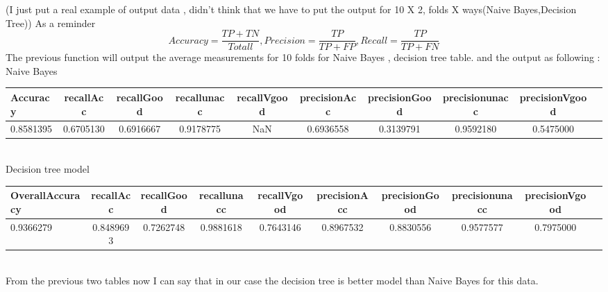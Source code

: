 \documentclass{article}
\begin{document}
\begin{landscape}
(I just put a real example of output data , didn't think that we have to put the output for 10 X 2, folds X ways(Naive Bayes,Decision Tree))
As a reminder \[Accuracy = \frac{TP+TN}{Totall},Precision = \frac{TP}{TP+FP},Recall = \frac{TP}{TP+FN}\] 
The previous function will output the average measurements for 10 folds for Naive Bayes , decision tree table. and the output as following :\\
Naive Bayes \\
\begin{tabular}{|l|*{9}{c|}}
		\hline
	Accuracy&recallAcc&recallGood&recallunacc&recallVgood&precisionAcc&precisionGood&precisionunacc&precisionVgood\\ 		\hline
0.8581395&0.6705130&0.6916667&0.9178775&NaN&0.6936558&0.3139791&0.9592180&0.5475000 \\		\hline
\end{tabular}\\

Decision tree model\\
\begin{tabular}{|l|*{9}{c|}}
	\hline
	OverallAccuracy&recallAcc&recallGood&recallunacc&recallVgood&precisionAcc&precisionGood&precisionunacc&precisionVgood\\ \hline
0.9366279&0.8489693&0.7262748&0.9881618&0.7643146&0.8967532&0.8830556&0.9577577&0.7975000\\ \hline
\end{tabular}\\
From the previous two tables now I can say that in our case the decision tree is better model than Naive Bayes for  this data.
\end{landscape}
\end{document}
